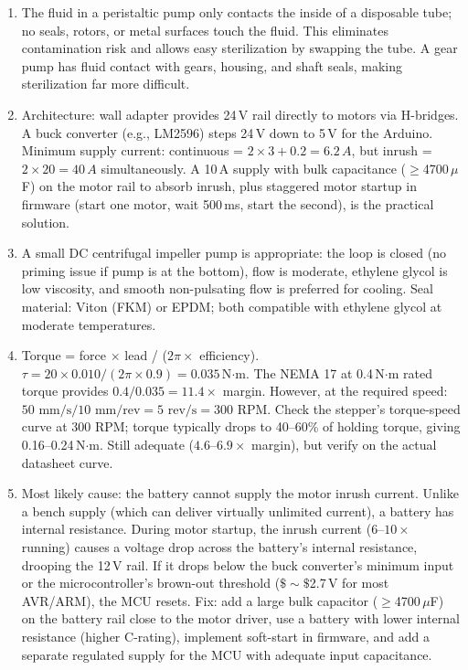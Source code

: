 \documentclass[11pt,letterpaper,twoside,openany]{book}
\begin{document}
\begin{enumerate}[leftmargin=1.5em]
  \item The fluid in a peristaltic pump only contacts the inside of a disposable tube; no seals, rotors, or metal surfaces touch the fluid. This eliminates contamination risk and allows easy sterilization by swapping the tube. A gear pump has fluid contact with gears, housing, and shaft seals, making sterilization far more difficult.

  \item Architecture: wall adapter provides 24\,V rail directly to motors via H-bridges. A buck converter (e.g., LM2596) steps 24\,V down to 5\,V for the Arduino. Minimum supply current: continuous = $2 \times 3 + 0.2 = 6.2\,A$, but inrush = $2 \times 20 = 40\,A$ simultaneously. A 10\,A supply with bulk capacitance ($\geq$4700\,$\mu$F) on the motor rail to absorb inrush, plus staggered motor startup in firmware (start one motor, wait 500\,ms, start the second), is the practical solution.

  \item A small DC centrifugal impeller pump is appropriate: the loop is closed (no priming issue if pump is at the bottom), flow is moderate, ethylene glycol is low viscosity, and smooth non-pulsating flow is preferred for cooling. Seal material: Viton (FKM) or EPDM; both compatible with ethylene glycol at moderate temperatures.

  \item Torque = force $\times$ lead / ($2\pi \times$ efficiency). $\tau = 20 \times 0.010 / (2\pi \times 0.9) = 0.035$\,N$\cdot$m. The NEMA 17 at 0.4\,N$\cdot$m rated torque provides $0.4 / 0.035 = 11.4\times$ margin. However, at the required speed: $50\text{ mm/s} / 10\text{ mm/rev} = 5\text{ rev/s} = 300\text{ RPM}$. Check the stepper's torque-speed curve at 300 RPM; torque typically drops to 40--60\% of holding torque, giving 0.16--0.24\,N$\cdot$m. Still adequate ($4.6$--$6.9\times$ margin), but verify on the actual datasheet curve.

  \item Most likely cause: the battery cannot supply the motor inrush current. Unlike a bench supply (which can deliver virtually unlimited current), a battery has internal resistance. During motor startup, the inrush current ($6$--$10\times$ running) causes a voltage drop across the battery's internal resistance, drooping the 12\,V rail. If it drops below the buck converter's minimum input or the microcontroller's brown-out threshold ($\$\sim\$$2.7\,V for most AVR/ARM), the MCU resets. Fix: add a large bulk capacitor ($\geq$4700\,$\mu$F) on the battery rail close to the motor driver, use a battery with lower internal resistance (higher C-rating), implement soft-start in firmware, and add a separate regulated supply for the MCU with adequate input capacitance.
\end{enumerate}
\end{document}
